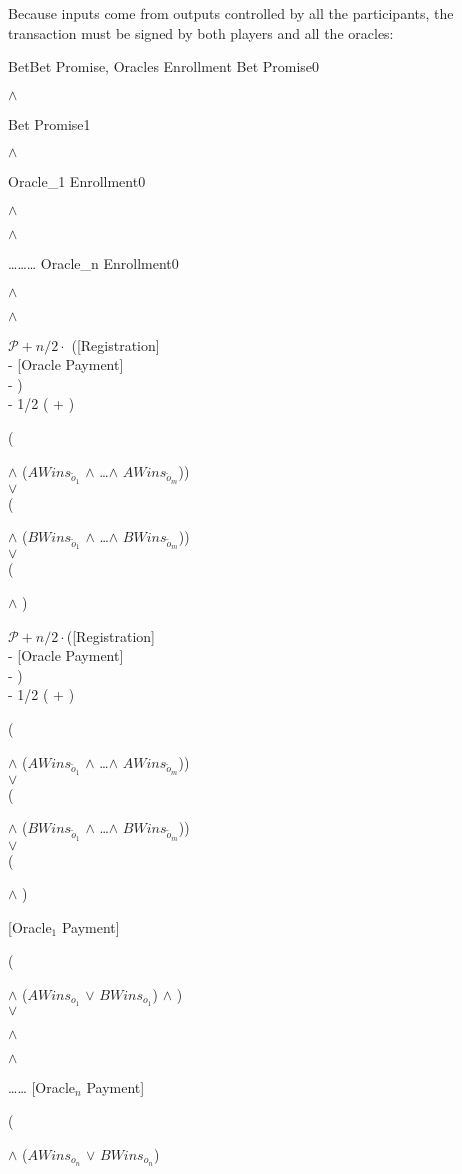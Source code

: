 Because inputs come from outputs controlled by all the participants, the
  transaction must be signed by both players and all the oracles:
\newpage
\small{
\transaction
    {Bet}{Bet Promise, Oracles Enrollment}
    {Bet Promise}{0}{\signature{A} $\wedge$ \signature{B}}
    {Bet Promise}{1}{\signature{A} $\wedge$ \signature{B}}
    {Oracle_1 Enrollment}{0}
        {\signature{A} $\wedge$ \signature{B} $\wedge$ \signature{o_1}}
    {\ldots}{\ldots}{\ldots}
    {Oracle_n Enrollment}{0}
        {\signature{A} $\wedge$ \signature{B} $\wedge$ \signature{o_n}}
    \stopinputs
    {$\mathcal{P} + n/2 \cdot$ ([Registration] \\
            - [Oracle Payment] \\
            - ) \\
            - 1/2 ( + )}
        {(\signature{A} $\wedge$ ($AWins_{\tilde{o}_1}$ $\wedge$ \ldots $\wedge$ $AWins_{\tilde{o}_m}$)) \\
                          $\vee$ \\
         (\signature{B} $\wedge$ ($BWins_{\tilde{o}_1}$ $\wedge$ \ldots $\wedge$ $BWins_{\tilde{o}_m}$)) \\
                                    $\vee$ \\
         (\signature{A} $\wedge$ )}
    {$\mathcal{P} + n/2 \cdot $([Registration] \\
            - [Oracle Payment] \\
            - ) \\
            - 1/2 ( + )}
        {(\signature{A} $\wedge$ ($AWins_{\tilde{o}_1}$ $\wedge$ \ldots $\wedge$ $AWins_{\tilde{o}_m}$)) \\
                          $\vee$ \\
         (\signature{B} $\wedge$ ($BWins_{\tilde{o}_1}$ $\wedge$ \ldots $\wedge$ $BWins_{\tilde{o}_m}$)) \\
                                    $\vee$ \\
         (\signature{B} $\wedge$ )}
    {[Oracle$_{1}$ Payment]}{(\signature{o_{1}} $\wedge$ ($AWins_{o_{1}}$ $\vee$ $BWins_{o_{1}}$) %
                      $\wedge$ ) \\
                      $\vee$ \\
                       \signature{A} $\wedge$ \signature{B} $\wedge$ }
    {\ldots}{\ldots}
    {[Oracle$_{n}$ Payment]}{(\signature{o_{n}} $\wedge$ ($AWins_{o_{n}}$ $\vee$ $BWins_{o_{n}}$) %
}}
